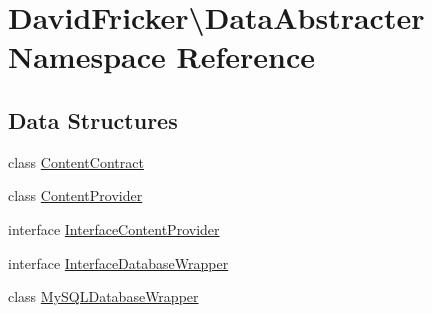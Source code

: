\hypertarget{namespace_david_fricker_1_1_data_abstracter}{}\section{David\+Fricker\textbackslash{}Data\+Abstracter Namespace Reference}
\label{namespace_david_fricker_1_1_data_abstracter}
\subsection*{Data Structures}
\begin{DoxyCompactItemize}
\item 
class \hyperlink{class_david_fricker_1_1_data_abstracter_1_1_content_contract}{Content\+Contract}
\item 
class \hyperlink{class_david_fricker_1_1_data_abstracter_1_1_content_provider}{Content\+Provider}
\item 
interface \hyperlink{interface_david_fricker_1_1_data_abstracter_1_1_interface_content_provider}{Interface\+Content\+Provider}
\item 
interface \hyperlink{interface_david_fricker_1_1_data_abstracter_1_1_interface_database_wrapper}{Interface\+Database\+Wrapper}
\item 
class \hyperlink{class_david_fricker_1_1_data_abstracter_1_1_my_s_q_l_database_wrapper}{My\+S\+Q\+L\+Database\+Wrapper}
\end{DoxyCompactItemize}
